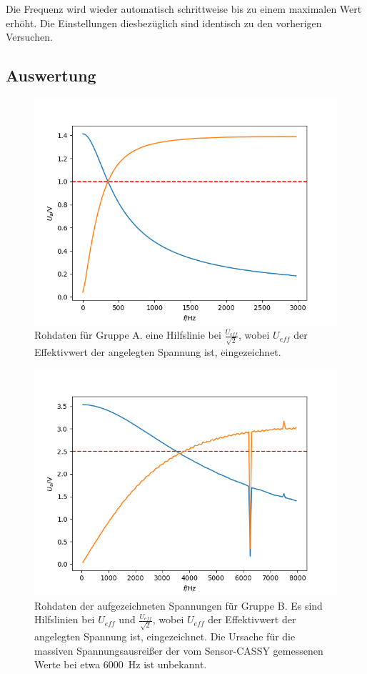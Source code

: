 \documentclass[12pt,a4paper]{article}
\begin{document}
Die Frequenz wird wieder automatisch schrittweise bis zu einem maximalen Wert erhöht. Die Einstellungen diesbezüglich sind identisch zu den vorherigen Versuchen. 


\subsection{Auswertung}

\begin{figure}
\centering
\includegraphics[scale=0.8]{Bilder/RohdatenHochTief_A.png}
\caption{Rohdaten für Gruppe A. eine Hilfslinie bei $\frac{U_{eff}}{\sqrt{2}}$, wobei $U_{eff}$ der Effektivwert der angelegten Spannung ist, eingezeichnet.}
\label{fig:RohdatenHochTief_A}
\end{figure}

\begin{figure}
\centering
\includegraphics[scale=0.8]{Bilder/RohdatenHochTief_B.png}
\caption{Rohdaten der aufgezeichneten Spannungen für Gruppe B. Es sind Hilfslinien bei $U_{eff}$ und $\frac{U_{eff}}{\sqrt{2}}$, wobei $U_{eff}$ der Effektivwert der angelegten Spannung ist, eingezeichnet. Die Ursache für die massiven Spannungsausreißer der vom Sensor-CASSY gemessenen Werte bei etwa \SI{6000}{\Hz} ist unbekannt.}
\label{fig:RohdatenHochTief_B}
\end{figure}
\end{document}
